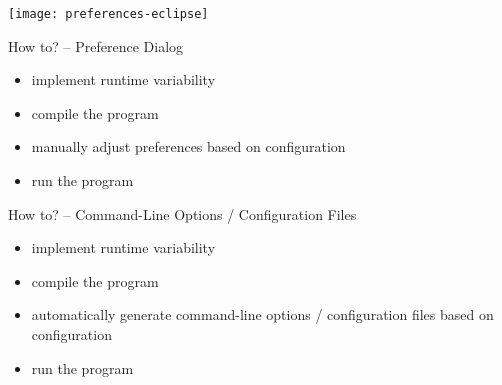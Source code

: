 \begin{frame}{\myframetitle}
	\begin{mycolumns}[widths={40},T]
		\texttt{[image: preferences-eclipse]}

		\begin{definition}{How to? -- Preference Dialog}
			\begin{itemize}
				\item implement runtime variability
				\item compile the program
				\item manually adjust preferences based on configuration
				\item run the program
			\end{itemize}
		\end{definition}
	\mynextcolumn

		\begin{definition}{How to? -- Command-Line Options / Configuration Files}
			\begin{itemize}
				\item implement runtime variability
				\item compile the program
				\item automatically generate command-line options / configuration files based on configuration
				\item run the program
			\end{itemize}
		\end{definition}
	\end{mycolumns}
\end{frame}

